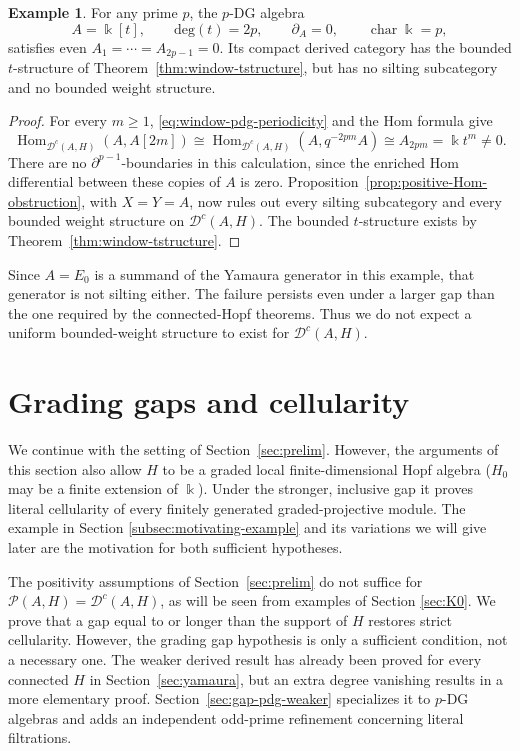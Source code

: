 \documentclass[11pt]{article}
\theoremstyle{definition}
\newtheorem{example}[thm]{Example}
\numberwithin{equation}{section}
\newcommand{\kk}{\Bbbk}
\newcommand{\Tcat}{\mathcal{P}(A,H)}
\newcommand{\Dc}{\mathcal{D}^c(A,H)}
\newcommand{\Hom}{\operatorname{Hom}}
\begin{document}
\begin{example}
\label{prop:no-bounded-weight}
For any prime $p$, the $p$-DG algebra
\begin{equation}\label{eq:weight-polynomial-example}
 A=\kk[t],\qquad \mathrm{deg}(t)=2p,\qquad\partial_A=0,
 \qquad\operatorname{char}\kk=p,
\end{equation}
satisfies even $A_1=\cdots=A_{2p-1}=0$.
Its compact derived category has the bounded $t$-structure of
Theorem~\ref{thm:window-tstructure}, but has no silting subcategory
and no bounded weight structure.
\end{example}
\begin{proof}
For every $m\ge1$, \eqref{eq:window-pdg-periodicity} and the Hom
formula give
\begin{equation}\label{eq:weight-infinite-positive-Hom}
 \Hom_{\Dc}(A,A[2m])
 \cong\Hom_{\Dc}(A,q^{-2pm}A)
 \cong A_{2pm}=\kk t^m\ne0.
\end{equation}
There are no $\partial^{p-1}$-boundaries in this calculation, since the enriched
Hom differential between these copies of $A$ is zero.
Proposition~\ref{prop:positive-Hom-obstruction}, with $X=Y=A$,
now rules out every silting subcategory and every bounded weight
structure on $\Dc$.  The bounded $t$-structure exists by
Theorem~\ref{thm:window-tstructure}.
\end{proof}
Since $A=E_{0}$ is a summand of the Yamaura generator in this example,
that generator is not silting either.  The failure persists even under
a larger gap than the one required by the connected-Hopf theorems.
Thus we do not expect a uniform bounded-weight structure to exist for $\Dc$.


\section{Grading gaps and cellularity}
\label{sec:hopf-gap}
We continue with the setting of Section~\ref{sec:prelim}.   However, the arguments of this section
also allow $H$ to be a graded local finite-dimensional Hopf algebra ($H_0$ may be a finite extension of $\kk$).  Under the stronger,
inclusive gap it proves literal cellularity of every finitely generated
graded-projective module.  The example in Section \ref{subsec:motivating-example} and its variations we will give later are the
motivation for both sufficient hypotheses.

The positivity assumptions of Section~\ref{sec:prelim} do not suffice for
$\Tcat=\Dc$, as will be seen from examples of Section \ref{sec:K0}.  We prove that
a gap equal to or longer than the support of $H$ restores strict cellularity.
However, the grading gap hypothesis is only a sufficient condition, not a necessary one.
The weaker derived result has already been proved for every connected
$H$ in Section~\ref{sec:yamaura}, but an extra degree vanishing results in a more elementary proof.  Section~\ref{sec:gap-pdg-weaker}
specializes it to $p$-DG algebras and adds an independent odd-prime
refinement concerning literal filtrations.  
\end{document}
